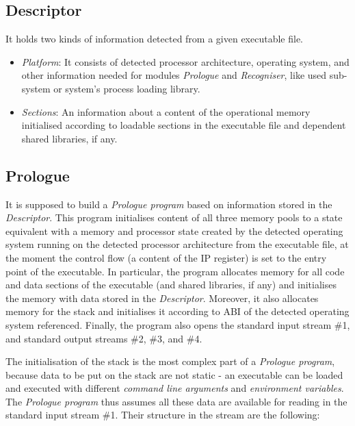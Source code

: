 \documentclass[10pt,twocolumn]{article}
\begin{document}
\subsection{Descriptor}
\label{sec:MAL:descriptor}

It holds two kinds of information detected from a given executable file.
\begin{itemize}
\item \emph{Platform}: It consists of detected processor architecture, operating
system, and other information needed for modules \emph{Prologue} and
\emph{Recogniser}, like used sub-system or system's process loading library. %
\item \emph{Sections}: An information about a content of the operational memory
initialised according to loadable sections in the executable file and dependent
shared libraries, if any.
\end{itemize} 

\subsection{Prologue}
\label{sec:MAL:prologue}

It is supposed to build a \emph{Prologue program} based on information stored in
the \emph{Descriptor}. This program initialises content of all three memory
pools to a state equivalent with a memory and processor state created by the
detected operating system running on the detected processor architecture from
the executable file, at the moment the control flow (a content of the IP
register) is set to the entry point of the executable. In particular, the
program allocates memory for all code and data sections of the executable (and
shared libraries, if any) and initialises the memory with data stored in the
\textit{Descriptor}. Moreover, it also allocates memory for the stack and
initialises it according to ABI of the detected operating system referenced.
Finally, the program also opens the standard input stream \#1, and standard
output streams \#2, \#3, and \#4.

The initialisation of the stack is the most complex part of a \emph{Prologue
program}, because data to be put on the stack are not static - an executable can
be loaded and executed with different \emph{command line arguments} and
\emph{environment variables}. The \emph{Prologue program} thus assumes all these
data are available for reading in the standard input stream \#1. Their structure
in the stream are the following:
\end{document}
